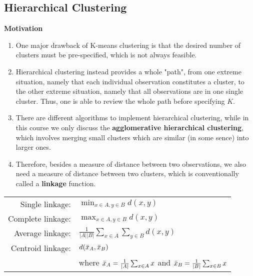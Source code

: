 \documentclass[12pt]{extarticle}
\newcommand{\<}{\langle}
\renewcommand{\>}{\rangle}
\theoremstyle{definition}
\begin{document}
\subsection{Hierarchical Clustering}
\textbf{Motivation}
\begin{enumerate}
    \item One major drawback of K-means clustering is that the desired number of clusters must be pre-specified, which is not always feasible.
    \item Hierarchical clustering instead provides a whole "path", from one extreme situation, namely that each individual observation constitutes a cluster, to the other extreme situation, namely that all observations are in one single cluster. Thus, one is able to review the whole path before specifying $K$.
    \item There are different algorithms to implement hierarchical clustering, while in this course we only discuss the \textbf{agglomerative hierarchical clustering}, which involves merging small clusters which are similar (in some sence) into larger ones.
    \item Therefore, besides a measure of distance between two observations, we also need a measure of distance between two clusters, which is conventionally called a \textbf{linkage} function.
\end{enumerate}

\begin{tcolorbox}[enhanced, drop fuzzy shadow, title=Linkage functions]
\renewcommand{\arraystretch}{2}
\begin{tabular}{rl}
Single linkage:& $\min_{x\in A, y\in B} d(x,y)$\\
Complete linkage:& $\max_{x\in A, y\in B}d(x,y)$\\
Average linkage:& $\frac{1}{|A||B|}\sum_{x\in A}\sum_{y\in B}d(x,y)$\\
Centroid linkage:& $d(\Bar{x}_A,\Bar{x}_B)$\\
& where $\Bar{x}_A=\frac{1}{|A|}\sum_{x\in A}x$ and $\Bar{x}_B=\frac{1}{|B|}\sum_{x\in B}x$
\end{tabular}
\end{tcolorbox}
\end{document}

